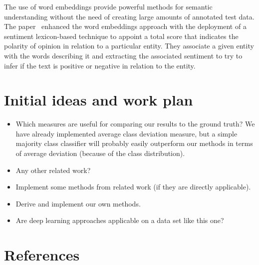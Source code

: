 \documentclass[a4paper, 12pt]{article}
\begin{document}
The use of word embeddings provide powerful methods for semantic understanding without the need of creating large amounts of annotated test data. 
The paper~\cite{sweeney2017multi} enhanced the word embeddings approach with the  deployment of a sentiment lexicon-based technique to appoint a total score that indicates the polarity of opinion in relation to a particular entity. 
They associate a given entity with the words describing it and extracting the associated sentiment to try to infer if the text is positive or negative in relation to the entity.



\section{Initial ideas and work plan}

\begin{itemize}
\item Which measures are useful for comparing our results to the ground truth? We have already implemented average class deviation measure, but a simple majority class classifier will probably easily outperform our methods in terms of average deviation (because of the class distribution).
\item Any other related work?
\item Implement some methods from related work (if they are directly applicable).
\item Derive and implement our own methods.
\item Are deep learning approaches applicable on a data set like this one?
\end{itemize}



\section{References}

\renewcommand\refname{}
\vspace{-50px}


\end{document}
